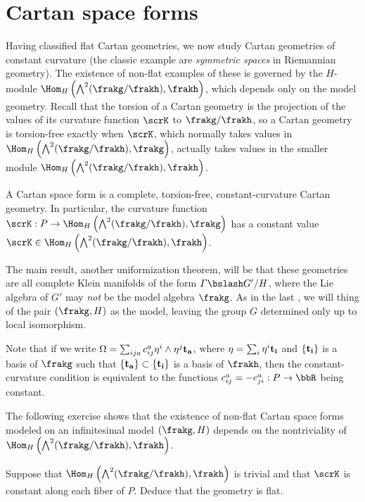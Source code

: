 \section{Cartan space forms}


Having classified flat Cartan geometries, we now study Cartan geometries of constant curvature (the classic example are \emph{symmetric spaces} in Riemannian geometry). The existence of non-flat examples of these is governed by the $H$-module $\Hom_H\left(\bigwedge^2(\frakg\slash\frakh),\frakh\right)$, which depends only on the model geometry. Recall that the torsion of a Cartan geometry is the projection of the values of its curvature function $\scrK$ to $\frakg\slash\frakh$, so a Cartan geometry is torsion-free exactly when $\scrK$, which normally takes values in $\Hom_H\left(\bigwedge^2(\frakg\slash\frakh),\frakg\right)$, actually takes values in the smaller module $\Hom_H\left(\bigwedge^2(\frakg\slash\frakh),\frakh\right)$.

\begin{defn}
    A Cartan space form is a complete, torsion-free, constant-curvature Cartan geometry. In particular, the curvature function $\scrK:P\to \Hom_H\left(\bigwedge^2(\frakg\slash\frakh),\frakg\right)$ has a constant value $\scrK\in \Hom_H\left(\bigwedge^2(\frakg\slash\frakh),\frakh\right)$.
\end{defn}

The main result, another uniformization theorem, will be that these geometries are all complete Klein manifolds of the form $\varGamma\bslash G'\slash H$, where the Lie algebra of $G'$ may \emph{not} be the model algebra $\frakg$. As in the last \sect, we will thing of the pair $(\frakg,H)$ as the model, leaving the group $G$ determined only up to local isomorphism.

Note that if we write $\Omega=\sum_{ij a}c_{ij}^a\eta^i\wedge\eta^j \bf{t}_a$, where $\eta=\sum_i \eta^i \bf{t}_i$ and $\{\bf{t}_i\}$ is a basis of $\frakg$ such that $\{\bf{t}_a\}\subset\{\bf{t}_i\}$ is a basis of $\frakh$, then the constant-curvature condition is equivalent to the functions $c_{ij}^a=-c_{ji}^a:P\to \bbR$ being constant. 

The following exercise shows that the existence of non-flat Cartan space forms modeled on an infinitesimal model $(\frakg,H)$ depends on the nontriviality of $\Hom_H\left(\bigwedge^2(\frakg\slash\frakh),\frakh\right)$.

\begin{xca}
    Suppose that $\Hom_H\left(\bigwedge^2(\frakg\slash\frakh),\frakh\right)$ is trivial and that $\scrK$ is constant along each fiber of $P$. Deduce that the geometry is flat.
\end{xca}

